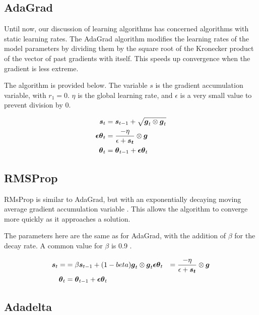 \documentclass{article}
\begin{document}

\subsection{AdaGrad} %

Until now, our discussion of learning algorithms has concerned algorithms with static learning rates. The AdaGrad algorithm modifies the learning rates of the model parameters by dividing them by the square root of the Kronecker product of the vector of past gradients with itself. This speeds up convergence when the gradient is less extreme. 

The algorithm is provided below. The variable \(s\) is the gradient accumulation variable, with \(r_1 = 0\). \(\eta\) is the global learning rate, and \(\epsilon\) is a very small value to prevent division by \(0\).

\begin{align*}
    \vb*{s}_t &= \vb*{s}_{t-1} + \sqrt{\vb*{g}_t \otimes \vb*{g}_t} \\
    \vb*{\epsilon \theta}_t &= \frac{-\eta}{\epsilon + \vb*{s_t}} \otimes \vb*{g} \\
    \vb*{\theta}_t &= \vb*{\theta}_{t-1} + \vb*{\epsilon \theta}_t
\end{align*}

\subsection{RMSProp} %

RMsProp is similar to AdaGrad, but with an exponentially decaying moving average gradient accumulation variable \cite{Goodfellow-et-al-2016}. This allows the algorithm to converge more quickly as it approaches a solution.

The parameters here are the same as for AdaGrad, with the addition of \(\beta\) for the decay rate. A common value for \(\beta\) is 0.9 \cite{pml1book}.

\begin{align*}
    \vb*{s}_t = &= \beta \vb*{s}_{t-1} + (1-beta)\vb*{g}_t \otimes \vb*{g}_t
    \vb*{\epsilon \theta}_t &= \frac{-\eta}{\epsilon + \vb*{s_t}} \otimes \vb*{g} \\
    \vb*{\theta}_t &= \vb*{\theta}_{t-1} + \vb*{\epsilon \theta}_t
\end{align*}

\subsection{Adadelta} %
\end{document}
